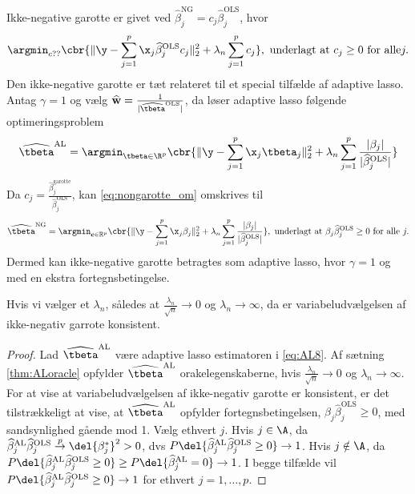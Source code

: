 Ikke-negative garotte er givet ved \(\widehat{\beta}_j^\text{NG} = c_j \widehat{\beta}_j^\text{OLS}\), hvor
\begin{align}
\argmin_{c??} \cbr{\Vert \y - \sum_{j=1}^p \x_j \widehat{\beta}_j^\text{OLS} c_j \Vert_2^2 + \lambda_n \sum_{j=1}^p c_j}, \ \text{underlagt at } c_j \geq 0 \text{ for alle} j. \label{eq:nongarotte_om}
\end{align}
Den ikke-negative garotte er tæt relateret til et special tilfælde af adaptive lasso.
Antag \(\gamma=1\) og vælg \(\widehat{\mathbf{w}}=\frac{1}{\vert \widehat{\tbeta}^{\text{OLS}} \vert}\), da løser adaptive lasso følgende optimeringsproblem
\begin{align}
\widehat{\tbeta}^\text{AL} = \argmin_{\tbeta \in \R^p} \cbr{ \Vert \y - \sum_{j=1}^p \x_j \tbeta_j \Vert_2^2 + \lambda_n \sum_{j=1}^p \frac{\vert \beta_j \vert}{\vert \widehat{\beta}_j^\text{OLS} \vert}} \label{eq:AL8}
\end{align}
Da \(c_j = \frac{\widehat{\beta}_j^\text{garotte}}{\widehat{\beta}_j^\text{OLS}}\), kan \eqref{eq:nongarotte_om} omskrives til
\begin{align*}
\widehat{\tbeta}^\text{NG} =\argmin_{\mathbf{c} \in \mathbb{R}^p}  \cbr{ \Vert \y - \sum_{j=1}^p \x_j \beta_j \Vert_2^2 + \lambda_n \sum_{j=1}^p  \frac{\vert \beta_j\vert}{\vert\widehat{\beta}_j^\text{OLS}\vert}}, \ \text{underlagt at } \beta_j \widehat{\beta}_j^\text{OLS} \geq 0 \text{ for alle } j.
\end{align*}
Dermed kan ikke-negative garotte betragtes som adaptive lasso, hvor \(\gamma=1\) og med en ekstra fortegnsbetingelse.
%
\begin{cor}
Hvis vi vælger et \(\lambda_n\), således at \(\frac{\lambda_n}{\sqrt{n}} \rightarrow 0\) og \(\lambda_n \rightarrow \infty\), da er variabeludvælgelsen af ikke-negativ garrote konsistent.
\end{cor}
%
\begin{proof}
Lad \(\widehat{\tbeta}^\text{AL}\) være adaptive lasso estimatoren i \eqref{eq:AL8}.
Af sætning \ref{thm:ALoracle} opfylder \(\widehat{\tbeta}^\text{AL}\) orakelegenskaberne, hvis \(\frac{\lambda_n}{\sqrt{n}} \rightarrow 0\) og \(\lambda_n \rightarrow \infty\).
For at vise at variabeludvælgelsen af ikke-negativ garotte er konsistent, er det tilstrækkeligt at vise, at \(\widehat{\tbeta}^\text{AL}\) opfylder fortegnsbetingelsen, \(\beta_j \widehat{\beta}_j^\text{OLS} \geq 0 \), med sandsynlighed gående mod 1.
Vælg ethvert \(j\).
Hvis \(j \in \A\), da \(\widehat{\beta}_j^\text{AL} \widehat{\beta}_j^\text{OLS} \overset{p}{\rightarrow} \del{\beta_j^*}^2 > 0\), dvs \(P \del{\widehat{\beta}_j^\text{AL} \widehat{\beta}_j^\text{OLS} \geq 0} \rightarrow 1\).
Hvis \(j \notin \A\), da \(P \del{\widehat{\beta}_j^\text{AL} \widehat{\beta}_j^\text{OLS} \geq 0} \geq P \del{\widehat{\beta}_j^\text{AL} = 0} \rightarrow 1\).
I begge tilfælde vil \(P \del{\widehat{\beta}_j^\text{AL} \widehat{\beta}_j^\text{OLS} \geq 0} \rightarrow 1\) for ethvert \(j = 1, \ldots, p\).
\end{proof}